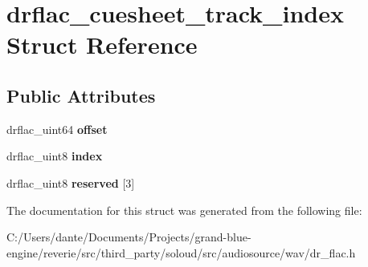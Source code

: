 \hypertarget{structdrflac__cuesheet__track__index}{}\section{drflac\+\_\+cuesheet\+\_\+track\+\_\+index Struct Reference}
\label{structdrflac__cuesheet__track__index}
\subsection*{Public Attributes}
\begin{DoxyCompactItemize}
\item 
\mbox{\label{structdrflac__cuesheet__track__index_af3941e3da8bab88be89ec9f1e87959c2}} 
drflac\+\_\+uint64 {\bfseries offset}
\item 
\mbox{\label{structdrflac__cuesheet__track__index_a46ed0cdfafd1ef1ba4e8ee5d3afb1bf3}} 
drflac\+\_\+uint8 {\bfseries index}
\item 
\mbox{\label{structdrflac__cuesheet__track__index_a2252c8071d62c2de973769b94cc191c8}} 
drflac\+\_\+uint8 {\bfseries reserved} \mbox{[}3\mbox{]}
\end{DoxyCompactItemize}


The documentation for this struct was generated from the following file\+:\begin{DoxyCompactItemize}
\item 
C\+:/\+Users/dante/\+Documents/\+Projects/grand-\/blue-\/engine/reverie/src/third\+\_\+party/soloud/src/audiosource/wav/dr\+\_\+flac.\+h\end{DoxyCompactItemize}
